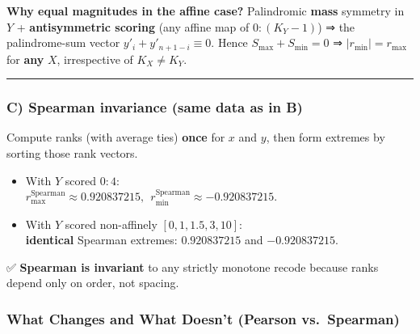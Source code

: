\documentclass[
  12pt,
]{article}
\theoremstyle{plain}
\theoremstyle{definition}
\theoremstyle{remark}
\begin{document}
\textbf{Why equal magnitudes in the affine case?} Palindromic
\textbf{mass} symmetry in \(Y\) + \textbf{antisymmetric scoring} (any
affine map of \(0{:}(K_Y-1)\)) ⇒ the palindrome-sum vector
\(y'_i+y'_{n+1-i}\equiv 0\). Hence \(S_{\max}+S_{\min}=0\) ⇒
\(|r_{\min}|=r_{\max}\) for \textbf{any} \(X\), irrespective of
\(K_X\neq K_Y\).

\begin{center}\rule{0.5\linewidth}{0.5pt}\end{center}

\subsubsection{\texorpdfstring{C) \textbf{Spearman invariance (same data
as in
B)}}{C) Spearman invariance (same data as in B)}}\label{c-spearman-invariance-same-data-as-in-b}

Compute ranks (with average ties) \textbf{once} for \(x\) and \(y\),
then form extremes by sorting those rank vectors.

\begin{itemize}
\item
  With \(Y\) scored \(0{:}4\):\\
  \(r_{\max}^{\text{Spearman}}\approx 0.920837215,\ \ r_{\min}^{\text{Spearman}}\approx -0.920837215\).
\item
  With \(Y\) scored non-affinely \([0,1,1.5,3,10]\):\\
  \textbf{identical} Spearman extremes: \(0.920837215\) and
  \(-0.920837215\).
\end{itemize}

✅ \textbf{Spearman is invariant} to any strictly monotone recode
because ranks depend only on order, not spacing.

\subsubsection{What Changes and What Doesn't (Pearson
vs.~Spearman)}\label{what-changes-and-what-doesnt-pearson-vs.-spearman}
\end{document}
